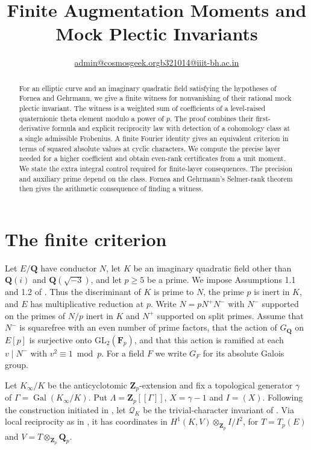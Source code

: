 \documentclass[11pt]{article}
\title{Finite Augmentation Moments and Mock Plectic Invariants}
\author{\small \href{mailto:admin@cosmosgeek.org}{admin@cosmosgeek.org}\qquad \href{mailto:b321014@iiit-bh.ac.in}{b321014@iiit-bh.ac.in}}
\date{}
\newcommand{\Z}{\mathbf Z}
\newcommand{\Q}{\mathbf Q}
\newcommand{\F}{\mathbf F}
\newcommand{\Gal}{\operatorname{Gal}}
\newcommand{\GQ}{G_{\Q}}
\begin{document}
\maketitle

\begin{abstract}
For an elliptic curve and an imaginary quadratic field satisfying the hypotheses of Fornea and Gehrmann, we give a finite witness for nonvanishing of their rational mock plectic invariant. The witness is a weighted sum of coefficients of a level-raised quaternionic theta element modulo a power of \(p\). The proof combines their first-derivative formula and explicit reciprocity law with detection of a cohomology class at a single admissible Frobenius. A finite Fourier identity gives an equivalent criterion in terms of squared absolute values at cyclic characters. We compute the precise layer needed for a higher coefficient and obtain even-rank certificates from a unit moment. We state the extra integral control required for finite-layer consequences. The precision and auxiliary prime depend on the class. Fornea and Gehrmann's Selmer-rank theorem then gives the arithmetic consequence of finding a witness.
\end{abstract}

\section{The finite criterion}

Let \(E/\Q\) have conductor \(N\), let \(K\) be an imaginary quadratic field other than \(\Q(i)\) and \(\Q(\sqrt{-3})\), and let \(p\geq5\) be a prime. We impose Assumptions 1.1 and 1.2 of \cite{FG}. Thus the discriminant of \(K\) is prime to \(N\), the prime \(p\) is inert in \(K\), and \(E\) has multiplicative reduction at \(p\). Write \(N=pN^+N^-\) with \(N^-\) supported on the primes of \(N/p\) inert in \(K\) and \(N^+\) supported on split primes. Assume that \(N^-\) is squarefree with an even number of prime factors, that the action of \(\GQ\) on \(E[p]\) is surjective onto \(\mathrm{GL}_2(\F_p)\), and that this action is ramified at each \(v\mid N^-\) with \(v^2\equiv1\bmod p\). For a field \(F\) we write \(G_F\) for its absolute Galois group.

Let \(K_\infty/K\) be the anticyclotomic \(\Z_p\)-extension and fix a topological generator \(\gamma\) of \(\Gamma=\Gal(K_\infty/K)\). Put \(\Lambda=\Z_p[[\Gamma]]\), \(X=\gamma-1\) and \(I=(X)\). Following the construction initiated in \cite{DF}, let \(\mathcal Q_K\) be the trivial-character invariant of \cite[eq.~(13)]{FG}. Via local reciprocity as in \cite[\S3.4.3]{FG}, it has coordinates in \(H^1(K,V)\otimes_{\Z_p} I/I^2\), for \(T=T_p(E)\) and \(V=T\otimes_{\Z_p}\Q_p\).
\end{document}
